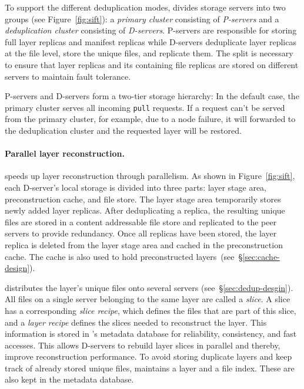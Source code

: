 To support the different deduplication modes, \sysname divides storage servers
into two groups (see Figure~\ref{fig:sift}): a \emph{primary cluster}
consisting of \emph{P-servers} and a \emph{deduplication cluster} consisting of
\emph{D-servers}.
%
P-servers are responsible for storing full layer replicas and manifest replicas
while D-servers deduplicate layer replicas at the file level, store the unique
files, and replicate them.
%
The split is necessary to ensure that layer replicas and its containing file
replicas are stored on different servers to maintain fault tolerance.


P-servers and D-servers form a two-tier storage hierarchy: In the default case,
the primary cluster serves all incoming \texttt{pull} requests.
%
If a request can't be served from the primary cluster, for example, due to a
node failure, it will forwarded to the deduplication cluster and the requested
layer will be restored.
%
%





\paragraph{Parallel layer reconstruction.}
%
\sysname speeds up layer reconstruction through parallelism.
%
As shown in Figure~\ref{fig:sift}, each D-server's local storage is divided
into three parts: layer stage area, preconstruction cache, and file store.
%
The layer stage area temporarily stores newly added layer replicas.
%
After deduplicating a replica, the resulting unique files are stored in a
content addressable file store and replicated to the peer servers to provide
redundancy. Once all replicas have been stored, the layer replica is deleted
from the layer stage area and cached in the preconstruction cache.
%
The cache is also used to hold preconstructed
layers~(see~\S\ref{sec:cache-design}).

\sysname distributes the layer's unique files onto several servers
(see~\S\ref{sec:dedup-desgin}).
%
All files on a single server belonging to the same layer are called a
\emph{slice}.
%
A slice has a corresponding \emph{slice recipe}, which defines the files that
are part of this slice, and a \emph{layer recipe} defines the slices needed to
reconstruct the layer.
%
This information is stored in \sysname{}'s metadata database for reliability,
consistency, and fast accesses. 
%
This allows D-servers to rebuild layer slices in parallel and thereby, improve
reconstruction performance.
%
To avoid storing duplicate layers and keep track of already stored unique
files, \sysname maintains a layer and a file index. These are also kept in the
metadata database.




